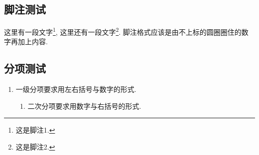 \zhlipsum[1]

\subsection{脚注测试}

这里有一段文字\footnote{这是脚注1.}, 这里还有一段文字\footnote{这是脚注2.}. 脚注格式应该是由不上标的圆圈圈住的数字再加上内容.

\zhlipsum

\subsection{分项测试}

\begin{enumerate}
  \item 一级分项要求用左右括号与数字的形式.
  \begin{enumerate}
    \item 二次分项要求用数字与右括号的形式.
  \end{enumerate}
\end{enumerate}

\zhlipsum[1]
